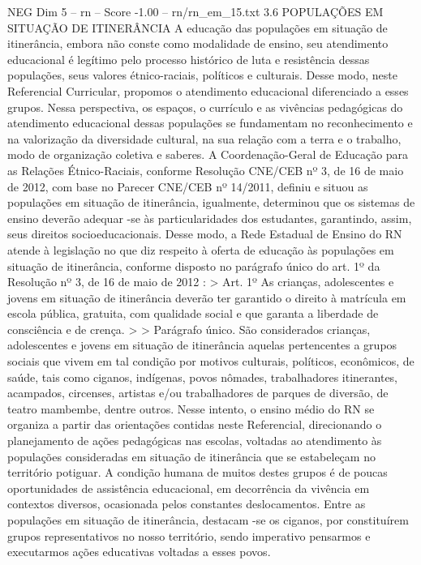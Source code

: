 \begin{textsample}{NEG Dim 5 – rn – Score -1.00 – rn/rn\_em\_15.txt}  \label{ex:f5_neg_150}
3.6 POPULAÇÕES EM SITUAÇÃO DE ITINERÂNCIA A educação das populações em situação de itinerância, embora não conste como modalidade de ensino, seu atendimento educacional é legítimo pelo processo histórico de luta e resistência dessas populações, seus valores étnico-raciais, políticos e culturais.
Desse modo, neste Referencial Curricular, propomos o atendimento educacional diferenciado a esses grupos.
Nessa perspectiva, os espaços, o currículo e as vivências pedagógicas do atendimento educacional dessas populações se fundamentam no reconhecimento e na valorização da diversidade cultural, na sua relação com a terra e o trabalho, modo de organização coletiva e saberes.
A Coordenação-Geral de Educação para as Relações Étnico-Raciais, conforme Resolução CNE/CEB nº 3, de 16 de maio de 2012, com base no Parecer CNE/CEB nº 14/2011, definiu e situou as populações em situação de itinerância, igualmente, determinou que os sistemas de ensino deverão adequar -se às particularidades dos estudantes, garantindo, assim, seus direitos socioeducacionais.
Desse modo, a Rede Estadual de Ensino do RN atende à legislação no que diz respeito à oferta de educação às populações em situação de itinerância, conforme disposto no parágrafo único do art. 1º da Resolução nº 3, de 16 de maio de 2012 : > Art. 1º As crianças, adolescentes e jovens em situação de itinerância deverão ter garantido o direito à matrícula em escola pública, gratuita, com qualidade social e que garanta a liberdade de consciência e de crença. > > Parágrafo único.
São considerados crianças, adolescentes e jovens em situação de itinerância aquelas pertencentes a grupos sociais que vivem em tal condição por motivos culturais, políticos, econômicos, de saúde, tais como ciganos, indígenas, povos nômades, trabalhadores itinerantes, acampados, circenses, artistas e/ou trabalhadores de parques de diversão, de teatro mambembe, dentre outros.
Nesse intento, o ensino médio do RN se organiza a partir das orientações contidas neste Referencial, direcionando o planejamento de ações pedagógicas nas escolas, voltadas ao atendimento às populações consideradas em situação de itinerância que se estabeleçam no território potiguar.
A condição humana de muitos destes grupos é de poucas oportunidades de assistência educacional, em decorrência da vivência em contextos diversos, ocasionada pelos constantes deslocamentos.
Entre as populações em situação de itinerância, destacam -se os ciganos, por constituírem grupos representativos no nosso território, sendo imperativo pensarmos e executarmos ações educativas voltadas a esses povos.

\end{textsample}
